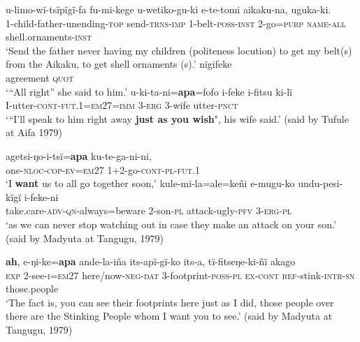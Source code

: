 \documentclass[output=paper]{langsci/langscibook}
\begin{document}
\begin{exe}
\ex \label{ex:eb66}
	\begin{xlist}
	\ex \label{ex:eb66a}
	\gll u-limo-wï-tsïpïgï-fa fu-mi-kege u-wetiko-gu-ki e-te-tomi aikaku-na, uguka-ki.\\
	1-child-father-unending-\textsc{top} send-\textsc{trns-imp} 1-belt-\textsc{poss-inst} 2-go=\textsc{purp} \textsc{name}-\textsc{all} shell.ornaments-\textsc{inst}\\
	\trans ‘Send the father never having my children (politeness locution)  to get my belt(s) from the  Aikaku, to get shell ornaments (s).'
	\ex \label{ex:eb66b}
	 nïgifeke\\
	agreement \textsc{quot}\\
	\trans `“All right” she said to him.'
	\ex \label{ex:eb66c}
	\gll u-ki-ta-ni=\textbf{apa}=fofo i-feke i-fitsu ki-lï\\
	I-utter-\textsc{cont-fut.1=em27=imm} 3-\textsc{erg} 3-wife utter-\textsc{pnct}\\
	\trans `“I’ll speak to him right away \textbf{just as you wish}", his wife said.' (said by Tufule at Aifa 1979) 
\end{xlist}
\end{exe}

\begin{exe}
\ex \label{ex:eb67}
	\begin{xlist}
	\ex 
	\gll agetsi-ŋo-i-tsï=\textbf{apa} ku-te-ga-ni-ni,\\
	one-\textsc{nloc-cop-ev=em27} 1+2-go-\textsc{cont-pl-fut.1}\\
	\trans ‘I \textbf{want} us to all go together soon,'
	\ex 
	\gll kule-mi-la=ale=keñi e-mugu-ko undu-pesi-kïgï i-feke-ni\\
	take.care-\textsc{adv-qn}-always=beware 2-son-\textsc{pl} attack-ugly-\textsc{pfv} 3-\textsc{erg-pl}\\
	\trans ‘as we can never stop watching out in case they make an attack on your son.’ (said by Madyuta at Tangugu, 1979)
\end{xlist}
\end{exe}

\begin{exe}
	\ex \label{ex:eb68}
	\gll \textbf{ah}, e-ŋi-ke=\textbf{apa} ande-la-iña its-apï-gï-ko its-a, tï-fitseŋe-ki-ñï akago\\
	\textsc{exp} 2-see-\textsc{i=em27} here/now-\textsc{neg-dat} 3-footprint-\textsc{poss-pl} \textsc{ex-cont} \textsc{ref}-stink-\textsc{intr-sn}  those.people\\
	\trans ‘The fact is, you can see their footprints here just as I did,  those people over there are the  Stinking People whom I want you to see.’ (said by Madyuta at Tangugu, 1979)
\end{exe}
\end{document}
